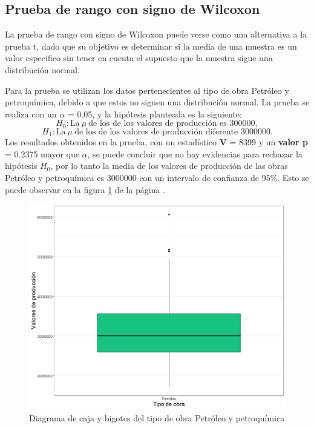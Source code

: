 \documentclass{article}
\begin{document}
\subsection{Prueba de rango con signo de Wilcoxon}
La prueba de rango con signo de Wilcoxon puede verse como una alternativa a la prueba t, dado que su objetivo es determinar si la media de una muestra es un valor especifico sin tener en cuenta el supuesto que la muestra sigue una distribución normal.

Para la prueba se utilizan los datos pertenecientes al tipo de obra Petróleo y petroquímica, debido a que estos no siguen una distribución normal. La prueba se realiza con un $\alpha$ = 0.05, y la hipótesis planteada es la siguiente: 
\begin{equation}\label{eq:1}
H_{0}:\text{La}\:  \mu\:  \text{de los de los valores de producción es 300000},    
\end{equation}
\begin{equation}\label{eq:2}
 H_{1}:\text{La}\: \mu \: \text{de los de los valores de producción diferente 3000000}. 
\end{equation}
Los resultados obtenidos en la prueba, con un estadístico \textbf{V} = 8399 y un \textbf{valor p} = 0.2375 mayor que $\alpha$, se puede concluir que no hay evidencias para rechazar la hipótesis $H_{0}$, por lo tanto la media de los valores de producción de las obras Petróleo y petroquímica es 3000000 con un intervalo de confianza de 95\%. Esto se puede observar en la figura \ref{fig:8} de la página \pageref{fig:8}.

\begin{figure}
\centering
\includegraphics[scale=0.45]{figuras/Wil.png}
\caption{Diagrama de caja y bigotes del tipo de obra Petróleo y petroquímica}
\label{fig:8}
\end{figure}
\end{document}
